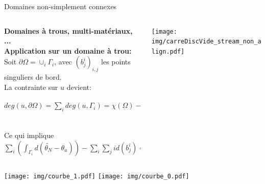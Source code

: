 \begin{frame}{Domaines non-simplement connexes}{}
\small
\vspace{-0.3cm}
\begin{columns}
\begin{column}{0.65\textwidth}
{\bf \color{onera_gray} Domaines à trous, multi-matériaux, ... }\\
\vspace{0.08cm}
\textbf{Application sur un domaine à trou:}\\
\vspace{0.08cm}
Soit $\partial\Omega=\cup_i\Gamma_i$, avec $(b_j^i)_{i,j}$ les points singuliers de bord.\\
\vspace{0.08cm}
La contrainte sur $u$ devient:\vspace{-0.1cm}
\begin{center}
    $deg(u, \partial\Omega)=\sum_i deg(u,\Gamma_i)=\chi(\Omega)-\sum_i\sum_jid(b_j^i).$
\end{center}
\\[-0.1cm]
Ce qui implique $\sum_i(\int_{\Gamma_i}d(\widetilde{\theta_N}-\theta_u))-\sum_i\sum_jid(b_j^i)=0,~~\forall~i$\\\end{column}
\begin{column}{0.35\textwidth}
\centering
\texttt{[image: img/carreDiscVide\_stream\_non\_align.pdf]}
\end{column}
\end{columns}
\vspace{0.1cm}
\centering
\texttt{[image: img/courbe\_1.pdf]}\hspace{0.6cm}
\texttt{[image: img/courbe\_0.pdf]}
\end{frame}

